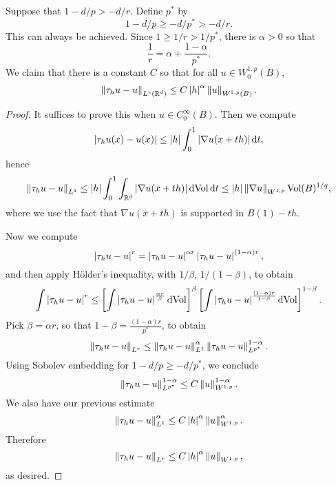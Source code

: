 \begin{lemma}
  Suppose that $1-d/p>-d/r$. Define $p^{*}$ by
  \begin{equation*}
    1-d/p\ge -d/p^{*}>-d/r. 
  \end{equation*}
  This can always be achieved. Since $1\ge 1/r>1/p^{*}$, there is $\alpha>0$ so that
  \begin{equation*}
    \frac{1}{r}=\alpha+\frac{1-\alpha}{p^{*}}.
  \end{equation*}
  We claim that there is a constant $C$ so that for all $u\in W^{1,p}_{0}(B)$,
  \begin{equation*}
    \left\lVert\tau_{h}u-u\right\rVert_{L^{r}(\mathbb{R}^{d})}\le C\left|h\right|^{\alpha}\left\lVert u\right\rVert_{W^{1,p}(B)}.
  \end{equation*}
\end{lemma}
\begin{proof}
  It suffices to prove this when $u\in C^{\infty}_{0}(B)$. Then we compute
  \begin{equation*}
    \left|\tau_{h}u(x)-u(x)\right|\le \left|h\right|\int_{0}^{1}\left|\nabla u(x+th)\right|\mathrm{d} t,
  \end{equation*}
  hence
  \begin{equation*}
    \left\lVert\tau_{h}u-u\right\rVert_{L^{1}}\le \left|h\right|\int_{0}^{1}\int_{\mathbb{R}^{d}}\left|\nabla u(x+th)\right|\mathrm{dVol}\,\mathrm{d} t\le \left|h\right|\left\lVert\nabla u\right\rVert_{W^{1,p}}\text{Vol}(B)^{1/q},
  \end{equation*}
  where we use the fact that $\nabla u(x+th)$ is supported in $B(1)-th$.
  
  Now we compute
  \begin{equation*}
    \left|\tau_{h}u-u\right|^{r}=\left|\tau_{h}u-u\right|^{\alpha r}\left|\tau_{h}u-u\right|^{(1-\alpha)r},
  \end{equation*}
  and then apply H\"older's inequality, with $1/\beta$, $1/(1-\beta)$, to obtain
  \begin{equation*}
   \int \left|\tau_{h}u-u\right|^{r}\le \left[\int\left|\tau_{h}u-u\right|^{\frac{\alpha r}{\beta}}\mathrm{dVol}\right]^{\beta}\left[\int\left|\tau_{h}u-u\right|^{\frac{(1-\alpha) r}{1-\beta}}\mathrm{dVol}\right]^{1-\beta}.
  \end{equation*}
  Pick $\beta=\alpha r$, so that $1-\beta=\frac{(1-\alpha)r}{p^{*}}$, to obtain
  \begin{equation*}
    \left\lVert\tau_{h}u-u\right\rVert_{L^{r}}\le \left\lVert\tau_{h}u-u\right\rVert_{L^{1}}^{\alpha }\left\lVert\tau_{h}u-u\right\rVert_{L^{p^{*}}}^{1-\alpha}.
  \end{equation*}
  Using Sobolev embedding for $1-d/p\ge -d/p^{*}$, we conclude
  \begin{equation*}
    \left\lVert\tau_{h}u-u\right\rVert_{L^{p^{*}}}^{1-\alpha}\le C\left\lVert u\right\rVert_{W^{1,p}}^{1-\alpha}.
  \end{equation*}
  We also have our previous estimate
  \begin{equation*}
    \left\lVert\tau_{h}u-u\right\rVert_{L^{1}}^{\alpha}\le C\left|h\right|^{\alpha}\left\lVert u\right\rVert_{W^{1,p}}^{\alpha}.
  \end{equation*}
  Therefore
  \begin{equation*}
    \left\lVert\tau_{h}u-u\right\rVert_{L^{r}}\le C\left|h\right|^{\alpha}\left\lVert u\right\rVert_{W^{1,p}},
  \end{equation*}
  as desired.  
\end{proof}
